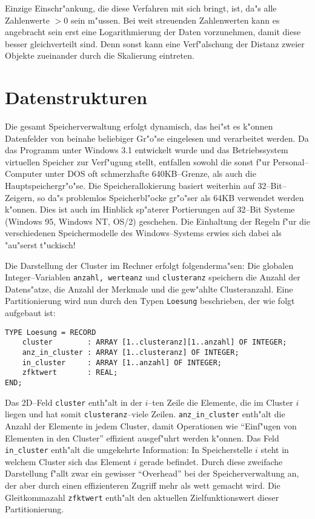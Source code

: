 Einzige Einschr"ankung, die diese Verfahren mit sich bringt, ist, 
da"s alle Zahlenwerte $> 0$ sein m"ussen.
Bei weit streuenden Zahlenwerten kann es angebracht sein erst eine
Logarithmierung der Daten vorzunehmen, damit diese besser
gleichverteilt sind. Denn sonst kann eine Verf"alschung der Distanz
zweier Objekte zueinander durch die Skalierung eintreten.

\section{Datenstrukturen}
Die gesamt Speicherverwaltung erfolgt dynamisch, das hei"st es k"onnen
Datenfelder von beinahe beliebiger Gr"o"se eingelesen und verarbeitet werden.
Da das Programm unter Windows 3.1 entwickelt wurde und das Betriebssystem
virtuellen Speicher zur Verf"ugung stellt, entfallen sowohl die sonst f"ur
Personal--Computer unter DOS oft schmerzhafte 640KB--Grenze, als
auch die Hauptspeichergr"o"se.
Die Speicherallokierung basiert weiterhin auf 32--Bit--Zeigern, so da"s
problemlos Speicherbl"ocke gr"o"ser als 64KB verwendet werden k"onnen.
Dies ist auch im Hinblick sp"aterer Portierungen auf 32--Bit Systeme
(Windows 95, Windows NT, OS/2) geschehen.
Die Einhaltung der Regeln f"ur die verschiedenen Speichermodelle des
Windows--Systems erwies sich dabei als "au"serst t"uckisch!

Die Darstellung der Cluster im Rechner erfolgt folgenderma"sen:
Die globalen Integer--Variablen {\tt anzahl, werteanz} und {\tt clusteranz}
speichern die Anzahl der Datens"atze, die Anzahl der Merkmale und die
gew"ahlte Clusteranzahl. Eine Partitionierung wird nun durch den Typen
{\tt Loesung} beschrieben, der wie folgt aufgebaut ist:

\begin{verbatim}
TYPE Loesung = RECORD
    cluster        : ARRAY [1..clusteranz][1..anzahl] OF INTEGER;
    anz_in_cluster : ARRAY [1..clusteranz] OF INTEGER;
    in_cluster     : ARRAY [1..anzahl] OF INTEGER;
    zfktwert       : REAL;
END;
\end{verbatim}
Das 2D--Feld {\tt cluster} enth"alt in der $i$--ten Zeile die Elemente,
die im Cluster $i$ liegen und hat somit {\tt clusteranz}--viele Zeilen.
{\tt anz\_in\_cluster} enth"alt die Anzahl der Elemente in jedem Cluster, 
damit Operationen wie "`Einf"ugen von Elementen in den Cluster"' effizient
ausgef"uhrt werden k"onnen.
Das Feld {\tt in\_cluster} enth"alt die umgekehrte Information: 
In Speicherstelle $i$ steht in welchem Cluster sich das Element $i$ gerade
befindet.
Durch diese zweifache Darstellung f"allt zwar ein gewisser "`Overhead"' bei
der  Speicherverwaltung an, der aber durch einen effizienteren Zugriff mehr als
wett gemacht wird. 
Die Gleitkommazahl {\tt zfktwert} enth"alt den aktuellen 
Zielfunktionswert dieser Partitionierung.

